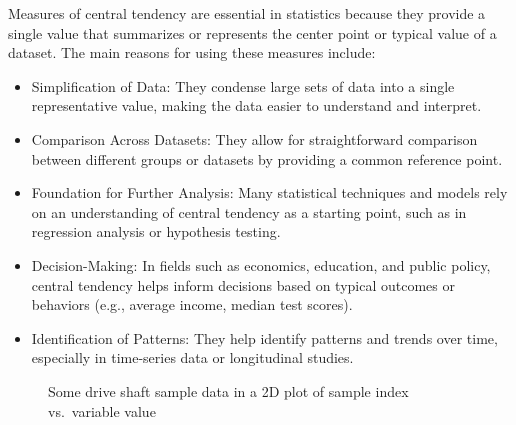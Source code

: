 \documentclass[
  a4paper,
]{scrbook}
\begin{document}
Measures of central tendency are essential in statistics because they
provide a single value that summarizes or represents the center point or
typical value of a dataset. The main reasons for using these measures
include:

\begin{itemize}
\item
  Simplification of Data: They condense large sets of data into a single
  representative value, making the data easier to understand and
  interpret.
\item
  Comparison Across Datasets: They allow for straightforward comparison
  between different groups or datasets by providing a common reference
  point.
\item
  Foundation for Further Analysis: Many statistical techniques and
  models rely on an understanding of central tendency as a starting
  point, such as in regression analysis or hypothesis testing.
\item
  Decision-Making: In fields such as economics, education, and public
  policy, central tendency helps inform decisions based on typical
  outcomes or behaviors (e.g., average income, median test scores).
\item
  Identification of Patterns: They help identify patterns and trends
  over time, especially in time-series data or longitudinal studies.
\end{itemize}

\begin{figure}[ht]


\caption{\label{fig-dat}Some drive shaft sample data in a 2D plot of
sample index vs.~variable value}

\end{figure}%
\end{document}
